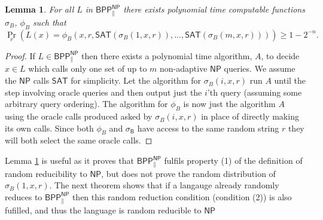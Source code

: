 \documentclass{article}
\newtheorem{lemma}[theorem]{Lemma}
\begin{document}
\begin{lemma}\label{lma:BPP rr similarity}
    For all $L$ in $\mathsf{BPP^{NP}_{\parallel}}$ there exists polynomial time computable functions $\sigma_{B}$, $\phi_{B}$ such that
    \[
    \Pr_{r}\left(
            L(x)=\phi_{B}(x,r,\mathsf{SAT}(\sigma_{B}(1,x,r)),\ldots, \mathsf{SAT}(\sigma_{B}(m, x, r)))
            \right)\geq 1-2^{-n}.
    \]
\end{lemma}
\begin{proof}
    If $L\in \mathsf{BPP^{NP}_{\parallel}}$ then there exists a polynomial time algorithm, $A$, to decide $x \in L$ which calls only one set of up to $m$ non-adaptive $\mathsf{NP}$ queries. We assume the $\mathsf{NP}$ calls $\mathsf{SAT}$ for simplicity. Let the algorithm for $\sigma_{B}(i,x,r)$ run $A$ until the step involving oracle queries and then output just the $i$'th query (assuming some arbitrary query ordering).
    The algorithm for $\phi_{B}$ is now just the algorithm $A$ using the oracle calls produced asked by $\sigma_{B}(i,x,r)$ in place of directly making its own calls. Since both $\phi_{B}$ and $\mathsf{\sigma_{B}}$ have access to the same random string $r$ they will both select the same oracle calls.
\end{proof}
Lemma \ref{lma:BPP rr similarity} is useful as it proves that $\mathsf{BPP^{NP}_{\parallel}}$ fulfils property (1) of the definition of random reducibility to $\mathsf{NP}$, but does not prove the random distribution of ${\sigma_B(1,x,r)}$. The next theorem shows that if a langauge already randomly reduces to $\mathsf{BPP^{NP}_{\parallel}}$ then this random reduction condition (condition (2)) is also fufilled, and thus the language is random reducible to $\mathsf{NP}$
\end{document}
